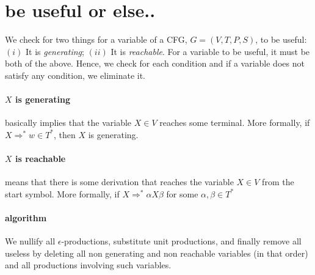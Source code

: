 \documentclass[11pt,letterpaper]{article}
\begin{document}
\section{be useful or else..}
We check for two things for a variable of a CFG, $G = (V,T,P,S)$, to be useful: $(i)$ It is \textit{generating}; $(ii)$ It is \textit{reachable}. For a variable to be useful, it must be both of the above. Hence, we check for each condition and if a variable does not satisfy any condition, we eliminate it.
\paragraph{$X$ is generating} basically implies that the variable $X \in V$ reaches some terminal. More formally, if $X \Rightarrow^* w \in T^*$, then $X$ is generating.
\paragraph{$X$ is reachable} means that there is some derivation that reaches the variable $X \in V$ from the start symbol. More formally, if $X \Rightarrow^* \alpha X \beta$ for some $\alpha, \beta \in T^*$
\paragraph{algorithm} We nullify all $\epsilon$-productions, substitute unit productions, and finally remove all useless by deleting all non generating and non reachable variables (in that order) and all productions involving such variables.
\end{document}
